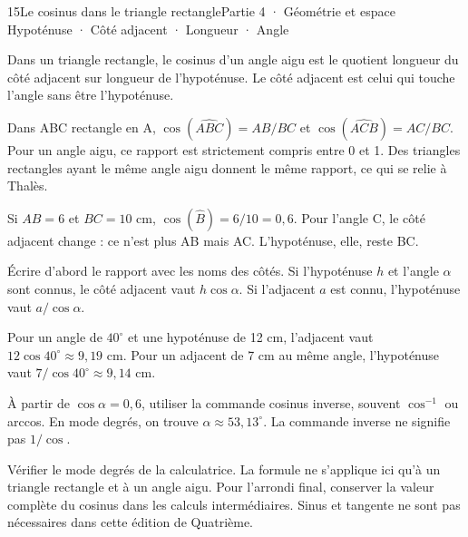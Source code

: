 \begin{ouverture}[geometrie]{15}{Le cosinus dans le triangle rectangle}{Partie 4 · Géométrie et espace}
{Hypoténuse · Côté adjacent · Longueur · Angle}
\end{ouverture}
\pagestyle{otMain}\essentiel\fontsize{11}{15}\selectfont
{}\label{cours-15-1}
\begin{definition}Dans un triangle rectangle, le cosinus d’un angle aigu est le quotient longueur du côté adjacent sur longueur de l’hypoténuse. Le côté adjacent est celui qui touche l’angle sans être l’hypoténuse.\end{definition}
\label{fig-cours-15-1-cours-cosinus}

\begin{propriete}Dans ABC rectangle en A, $\cos(\widehat{ABC})=AB/BC$ et $\cos(\widehat{ACB})=AC/BC$. Pour un angle aigu, ce rapport est strictement compris entre 0 et 1. Des triangles rectangles ayant le même angle aigu donnent le même rapport, ce qui se relie à Thalès.\end{propriete}
\begin{exemple}Si $AB=6$ et $BC=10$ cm, $\cos(\widehat B)=6/10=0{,}6$. Pour l’angle C, le côté adjacent change : ce n’est plus AB mais AC. L’hypoténuse, elle, reste BC.\end{exemple}
\clearpage
{}\label{cours-15-2}
\begin{savoirfaire}Écrire d’abord le rapport avec les noms des côtés. Si l’hypoténuse $h$ et l’angle $\alpha$ sont connus, le côté adjacent vaut $h\cos\alpha$. Si l’adjacent $a$ est connu, l’hypoténuse vaut $a/\cos\alpha$.\end{savoirfaire}
\begin{exemple}Pour un angle de $40^\circ$ et une hypoténuse de 12 cm, l’adjacent vaut $12\cos40^\circ\approx9{,}19$ cm. Pour un adjacent de 7 cm au même angle, l’hypoténuse vaut $7/\cos40^\circ\approx9{,}14$ cm.\end{exemple}
\begin{savoirfaire}À partir de $\cos\alpha=0{,}6$, utiliser la commande cosinus inverse, souvent $\cos^{-1}$ ou arccos. En mode degrés, on trouve $\alpha\approx53{,}13^\circ$. La commande inverse ne signifie pas $1/\cos$.\end{savoirfaire}
\begin{attention}Vérifier le mode degrés de la calculatrice. La formule ne s’applique ici qu’à un triangle rectangle et à un angle aigu. Pour l’arrondi final, conserver la valeur complète du cosinus dans les calculs intermédiaires. Sinus et tangente ne sont pas nécessaires dans cette édition de Quatrième.\end{attention}

